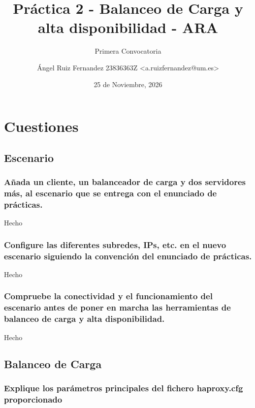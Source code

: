 \documentclass[12pt]{article}
\title{Práctica 2 - Balanceo de Carga y alta disponibilidad - ARA}
\subtitle{Primera Convocatoria}
\date{25 de Noviembre, 2026}
\author{Ángel Ruiz Fernandez 23836363Z \textless a.ruizfernandez@um.es\textgreater}
\begin{document}
    \maketitle
    \pagebreak

    \tableofcontents
    \pagebreak

    \section{Cuestiones}

    \subsection{Escenario}

    \subsubsection{Añada un cliente, un balanceador de carga y dos servidores más, al escenario que se entrega con el enunciado de prácticas.}

    Hecho

    \subsubsection{Configure las diferentes subredes, IPs, etc. en el nuevo escenario siguiendo la convención del enunciado de prácticas.}

    Hecho

    \subsubsection{Compruebe la conectividad y el funcionamiento del escenario antes de poner en marcha las herramientas de balanceo de carga y alta disponibilidad.}

    Hecho

    \subsection{Balanceo de Carga}

    \subsubsection{Explique los parámetros principales del fichero haproxy.cfg proporcionado}
\end{document}
